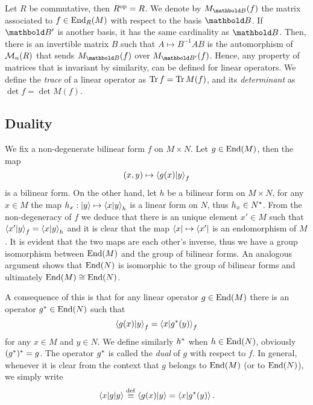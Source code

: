 Let $R$ be commutative, then $R^{\mathrm{op}} = R$. We denote by
$M_{\basis{B}}(f)$ the matrix associated to $f\in\operatorname{End}_R(M)$ with
respect to the basis $\basis{B}$.  If $\basis{B'}$ is another basis,
it has the same cardinality as $\basis{B}$. Then, there is an
invertible matrix $B$ such that $A\mapsto B^{-1}AB$ is the
automorphism of $\operatorname{\mathcal{M}}_n(R)$ that sends $M_{\basis{B}}(f)$ over
$M_{\basis{B'}}(f)$. Hence, any property of matrices that is invariant
by similarity, can be defined for linear operators. We define the
 \emph{trace} of a linear
operator as $\operatorname{Tr} f = \operatorname{Tr} M(f)$, and its
\emph{determinant} as $\det f = \det
M(f)$.


\subsection{Duality}
\label{sec:linear-algebra:duality}
We fix a non-degenerate bilinear form $f$ on $M\times N$. Let
$g\in\operatorname{End}(M)$, then the map
\[(x,y) \mapsto \left\langle g(x) \middle| y \right\rangle_f\] is a bilinear form. On the other
hand, let $h$ be a bilinear form on $M\times N$, for any $x\in M$ the
map $h_x : \left\lvert y \right\rangle \mapsto \left\langle x \middle| y \right\rangle_h$ is a linear form on $N$,
thus $h_x\in N^\ast$. From the non-degeneracy of $f$ we deduce that
there is an unique element $x'\in M$ such that
$\left\langle x' \middle| y \right\rangle_f=\left\langle x \middle| y \right\rangle_h$ and it is clear that the map
$\left\langle x \right\rvert\mapsto \left\langle x' \right\rvert$ is an endomorphism of $M$. It is evident
that the two maps are each other's inverse, thus we have a group
isomorphism between $\operatorname{End}(M)$ and the group of bilinear forms. An
analogous argument shows that $\operatorname{End}(N)$ is isomorphic to the group of
bilinear forms and ultimately $\operatorname{End}(M)\cong\operatorname{End}(N)$.

A consequence of this is that for any linear operator $g\in\operatorname{End}(M)$
there is an operator $g^\ast\in\operatorname{End}(N)$ such that
\[\left\langle g(x) \middle| y \right\rangle_f = \left\langle x \middle| g^\ast(y) \right\rangle_f\]
for any $x\in M$ and $y\in N$. We define similarly $h^\ast$ when
$h\in\operatorname{End}(N)$, obviously $(g^\ast)^\ast = g$. The operator
$g^\ast$ is called the
\emph{dual} of $g$ with
respect to $f$. In general, whenever it is clear from the context that
$g$ belongs to $\operatorname{End}(M)$ (or to $\operatorname{End}(N)$), we simply
write
\[\left\langle x \middle| g \middle| y \right\rangle \overset{\mathrm{def}}{\equiv} \left\langle g(x) \middle| y \right\rangle = \left\langle x \middle| g^\ast(y) \right\rangle\text{.}\]

